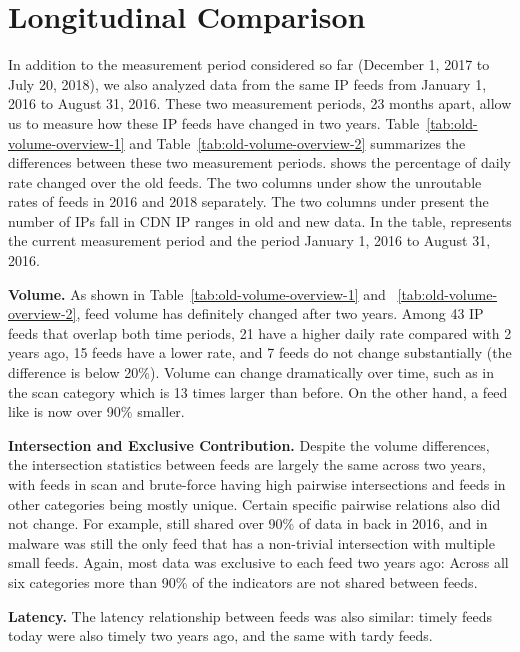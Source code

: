 \section{Longitudinal Comparison}
\label{sec:new_vs_old}

In addition to the measurement period considered so far (December 1, 2017 to July 20, 2018), we also analyzed data from the same IP feeds from January 1, 2016 to August 31, 2016. These two measurement periods, 23 months apart, allow us to measure how these IP feeds have changed in two years. Table~\ref{tab:old-volume-overview-1} and
Table~\ref{tab:old-volume-overview-2} summarizes the differences between these two measurement periods.  shows the percentage of daily rate changed over the old feeds.
The two columns under  show the unroutable rates of feeds in 2016 and 2018 separately. The two columns under  present the number of IPs fall in CDN IP ranges in old and new data. In the table,  represents the current measurement period and  the period  January 1, 2016 to August 31, 2016.


\noindent\textbf{Volume.}
As shown in Table~\ref{tab:old-volume-overview-1} and ~\ref{tab:old-volume-overview-2}, feed volume has definitely changed after two years. Among 43 IP feeds that overlap both time periods,
21 have a higher daily rate compared with 2 years ago, 15 feeds
have a lower rate, and 7 feeds do not change substantially (the difference is below 20\%).
Volume can change dramatically over time, such as {\feedTSAlienVault}
in the scan category which is 13 times larger than before. On the other hand, a feed like {\feedTSBots} is now over 90\% smaller.

\noindent\textbf{Intersection and Exclusive Contribution.}
Despite the volume differences, the intersection statistics between feeds are largely the same across two years,
with feeds in scan and brute-force having high pairwise intersections and
feeds in other categories being mostly unique. Certain specific pairwise relations also did not change.
For example, {\feedbadipssh} still shared over 90\% of data in {\feeddangerrule} back in 2016, and {\feedetiprep} in malware
was still the only feed that has a non-trivial intersection with multiple small feeds.
Again, most data was exclusive to each feed two years ago: Across all
six categories more than 90\% of the indicators are not shared between feeds.

\noindent\textbf{Latency.}
The latency relationship between feeds was also similar:
timely feeds today were also timely two years ago, and the same with tardy feeds.

